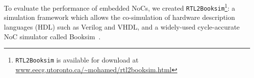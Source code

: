 %
%
%
%

To evaluate the performance of embedded NoCs, we created \texttt{RTL2Booksim}\footnote{\texttt{RTL2Booksim} is available for download at \\\url{www.eecg.utoronto.ca/~mohamed/rtl2booksim.html}}: a simulation framework which allows the co-simulation of hardware description languages (HDL) such as Verilog and VHDL, and a widely-used cycle-accurate NoC simulator called Booksim~\cite{booksim}.


%
%
